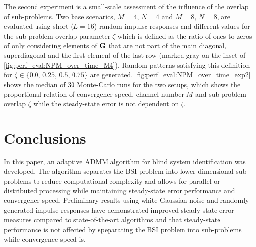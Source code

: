 \documentclass{article}
\begin{document}
The second experiment is a small-scale assessment of the influence of the overlap of sub-problems.
Two base scenarios, \(M=4,\,N=4\) and \(M=8,\,N=8\), are evaluated using short (\(L=16\)) random impulse responses and different values for the sub-problem overlap parameter \(\zeta\) which is defined as the ratio of ones to zeros of only considering elements of \(\bm{\mathrm{G}}\) that are not part of the main diagonal, superdiagonal and the first element of the last row (marked gray on the inset of \autoref{fig:perf_eval:NPM_over_time_M4}).
Random patterns satisfying this definition for \(\zeta \in \{0.0,\,0.25,\,0.5,\,0.75\}\) are generated.
\autoref{fig:perf_eval:NPM_over_time_exp2} shows the median of 30 Monte-Carlo runs for the two setups, which shows the proportional relation of convergence speed, channel number \(M\) and sub-problem overlap \(\zeta\) while the steady-state error is not dependent on \(\zeta\).




\section{Conclusions}
\label{sec:conclusion}
In this paper, an adaptive ADMM algorithm for blind system identification was developed.
The algorithm separates the BSI problem into lower-dimensional sub-problems to reduce computational complexity and allows for parallel or distributed processing while maintaining steady-state error performance and convergence speed.
Preliminary results using white Gaussian noise and randomly generated impulse responses have demonstrated improved steady-state error measures compared to state-of-the-art algorithms and that  steady-state performance is not affected by speparating the BSI problem into sub-problems while convergence speed is.



\end{document}

